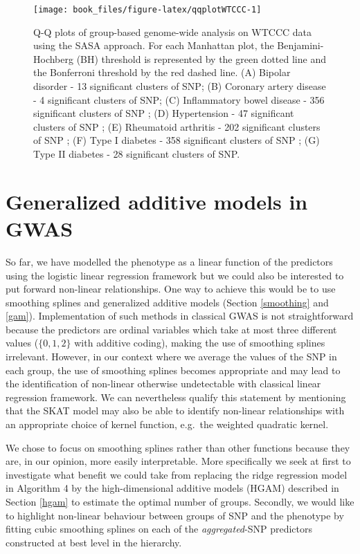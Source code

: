 \documentclass[]{book}
\begin{document}
\begin{figure}

{\centering \texttt{[image: book\_files/figure-latex/qqplotWTCCC-1]} 

}

\caption{Q-Q plots of group-based genome-wide analysis on WTCCC data using the SASA approach. For each Manhattan plot, the Benjamini-Hochberg (BH) threshold is represented by the green dotted line and the Bonferroni threshold by the red dashed line. (A) Bipolar disorder - 13 significant clusters of SNP; (B) Coronary artery disease - 4 significant clusters of SNP; (C) Inflammatory bowel disease - 356 significant clusters of SNP ; (D) Hypertension - 47 significant clusters of SNP ; (E) Rheumatoid arthritis - 202 significant clusters of SNP ; (F) Type I diabetes - 358 significant clusters of SNP ; (G) Type II diabetes - 28 significant clusters of SNP.}\label{fig:qqplotWTCCC}
\end{figure}

\hypertarget{leosgam}{%
\section{Generalized additive models in GWAS}\label{leosgam}}

So far, we have modelled the phenotype as a linear function of the
predictors using the logistic linear regression framework but we could
also be interested to put forward non-linear relationships. One way to
achieve this would be to use smoothing splines and generalized additive
models (Section \ref{smoothing} and \ref{gam}). Implementation of
such methods in classical GWAS is not straightforward because the
predictors are ordinal variables which take at most three different
values (\(\lbrace 0,1,2 \rbrace\) with additive coding), making the use
of smoothing splines irrelevant. However, in our context where we
average the values of the SNP in each group, the use of smoothing
splines becomes appropriate and may lead to the identification of
non-linear otherwise undetectable with classical linear regression
framework. We can nevertheless qualify this statement by mentioning that
the SKAT model may also be able to identify non-linear relationships
with an appropriate choice of kernel function, e.g.~the weighted
quadratic kernel.

We chose to focus on smoothing splines rather than other functions
because they are, in our opinion, more easily interpretable. More
specifically we seek at first to investigate what benefit we could take
from replacing the ridge regression model in Algorithm 4 by the high-dimensional additive models (HGAM)
described in Section \ref{hgam} to estimate the optimal number of
groups. Secondly, we would like to highlight non-linear behaviour
between groups of SNP and the phenotype by fitting cubic smoothing
splines on each of the \emph{aggregated}-SNP predictors constructed at best
level in the hierarchy.
\end{document}
